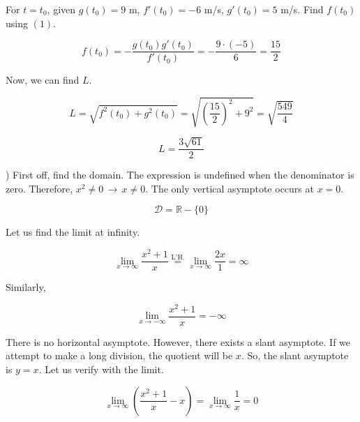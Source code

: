 \documentclass{article}
\begin{document}
\noindent For $t=t_0$, given $g(t_0) = 9$ m, $f'(t_0) = -6$ m/s, $g'(t_0) = 5$ m/s. Find $f(t_0)$ using $(1)$.

\begin{equation*}f(t_0) = -\frac{g(t_0)g'(t_0)}{f'(t_0)} = -\frac{9\cdot (-5)}{6} = \frac{15}{2}\end{equation*}

\noindent Now, we can find $L$.

\begin{equation*}L =\sqrt{f^2(t_0) + g^2(t_0)} = \sqrt{\left(\frac{15}{2}\right)^2 + 9^2} = \sqrt{\frac{549}{4}}\end{equation*}

\hfill

\begin{equation*}\boxed{L=\frac{3\sqrt{61}}{2}}\end{equation*}

\hfill

) First off, find the domain. The expression is undefined when the denominator is zero. Therefore, $x^2 \neq 0 \,\rightarrow\, x\neq0$. The only vertical asymptote occurs at $x = 0$.

\begin{equation*}\mathcal{D} = \mathbb{R} - \{0\} \end{equation*}

\hfill

\noindent Let us find the limit at infinity.

\begin{equation*}\lim_{x\to \infty} \frac{x^2+1}{x} \overset{\text{L'H.}}{=} \lim_{x\to \infty} \frac{2x}{1} = \infty\end{equation*}

\noindent Similarly,

\begin{equation*}\lim_{x\to -\infty} \frac{x^2+ 1}{x} = -\infty\end{equation*}

\hfill

\noindent There is no horizontal asymptote. However, there exists a slant asymptote. If we attempt to make a long division, the quotient will be $x$. So, the slant asymptote is $y=x$. Let us verify with the limit.

\begin{equation*}\lim_{x\to\infty} \left(\frac{x^2+1}{x} - x\right) = \lim_{x\to\infty} \frac{1}{x} = 0\end{equation*}
\end{document}
